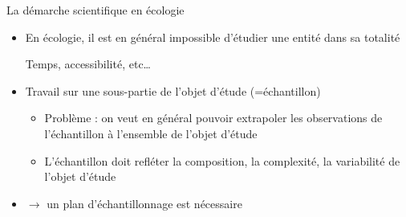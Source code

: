 \message{ !name(cours_DIE_ONIRIS_Suivi_populations_oiseaux.tex)}\documentclass[10pt]{beamer}
\begin{document}
\begin{frame}{La démarche scientifique en écologie}
  \begin{itemize}
  \item En écologie, il est en général impossible d’étudier une entité
    dans sa totalité \\
    \begin{footnotesize}
    Temps, accessibilité, etc…      
    \end{footnotesize}
  \item Travail sur une sous-partie de l’objet d’étude (=échantillon)
    \begin{itemize}
    \item Problème : on veut en général pouvoir extrapoler les
      observations de l’échantillon à l’ensemble de l’objet d’étude
    \item L’échantillon doit refléter la composition, la complexité, la variabilité de l’objet d’étude
    \end{itemize}
  \item $\rightarrow$ un plan d’échantillonnage est nécessaire
  \end{itemize}
\end{frame}
\end{document}
